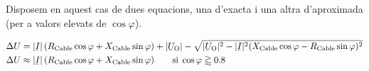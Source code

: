 Disposem en aquest cas de dues equacions, una d'exacta i una altra d'aproximada (per a valors elevats de $\cos \varphi$).

\begin{subequations}
\begin{align}
   \Delta U &= |\cmplx{I}| \,( R\ped{Cable} \cos \varphi + X\ped{Cable} \sin \varphi) + |\cmplx{U}\ped{O}| - \sqrt{|\cmplx{U}\ped{O}|^2 - |\cmplx{I}|^2 ( X\ped{Cable} \cos \varphi - R\ped{Cable} \sin \varphi )^2} \label{eq:cdt_trif_exact} \\
   \Delta U &\approx |\cmplx{I}| \,( R\ped{Cable} \cos \varphi + X\ped{Cable} \sin \varphi) \qquad \text{si} \; \cos \varphi \gtrapprox \num{0,8} \label{eq:cdt_trif_aprox}
\end{align}
\end{subequations}

